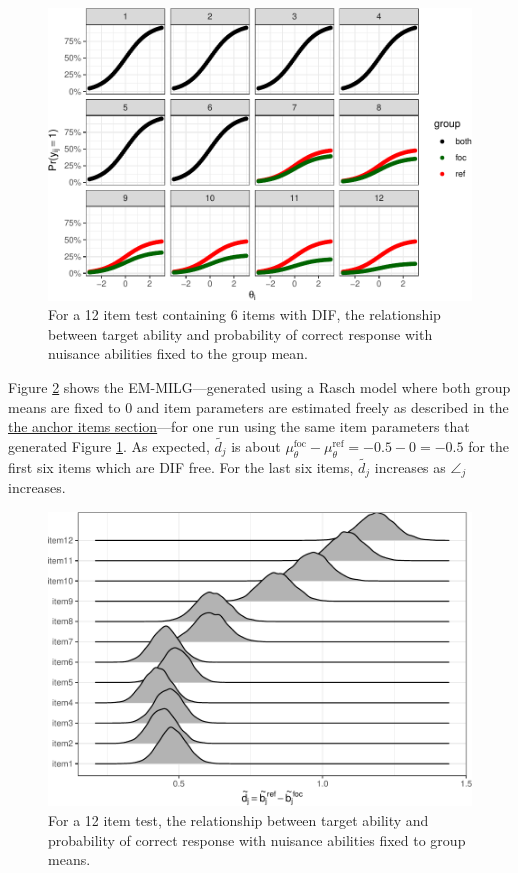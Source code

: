 \documentclass[
  11pt,
]{article}
\begin{document}
\begin{figure}[H]

{\centering \includegraphics[width=0.7\linewidth]{paper_files/figure-latex/difmap-1} 

}

\caption{For a 12 item test containing 6 items with DIF, the relationship between target ability and probability of correct response with nuisance abilities fixed to the group mean.}\label{fig:difmap}
\end{figure}

Figure \ref{fig:simemmlg} shows the EM-MILG---generated using a Rasch model where both group means are fixed to 0 and item parameters are estimated freely as described in the \protect\hyperlink{anchoritems}{the anchor items section}---for one run using the same item parameters that generated Figure \ref{fig:difmap}. As expected, \(\tilde{d_j}\) is about \(\mu_\theta^\text{foc} - \mu_\theta^\text{ref} = -0.5 - 0 = -0.5\) for the first six items which are DIF free. For the last six items, \(\tilde{d_j}\) increases as \(\angle_j\) increases.

\begin{figure}[H]

{\centering \includegraphics[width=0.7\linewidth]{paper_files/figure-latex/simemmlg-1} 

}

\caption{For a 12 item test, the relationship between target ability and probability of correct response with nuisance abilities fixed to group means.}\label{fig:simemmlg}
\end{figure}
\end{document}
